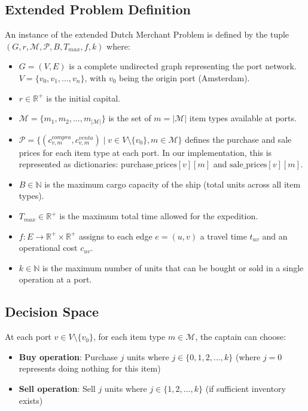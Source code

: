 \documentclass[12pt]{article}
\begin{document}
\subsection{Extended Problem Definition}

An instance of the extended Dutch Merchant Problem is defined by the tuple $(G, r, \mathcal{M}, \mathcal{P}, B, T_{max}, f, k)$ where:

\begin{itemize}
    \item $G=(V, E)$ is a complete undirected graph representing the port network. $V = \{v_0, v_1, ..., v_n\}$, with $v_0$ being the origin port (Amsterdam).
    \item $r \in \mathbb{R}^+$ is the initial capital.
    \item $\mathcal{M} = \{m_1, m_2, ..., m_{|\mathcal{M}|}\}$ is the set of $m = |\mathcal{M}|$ item types available at ports.
    \item $\mathcal{P} = \{(c_{v,m}^{compra}, c_{v,m}^{venta}) \mid v \in V \setminus \{v_0\}, m \in \mathcal{M}\}$ defines the purchase and sale prices for each item type at each port. In our implementation, this is represented as dictionaries: $\text{purchase\_prices}[v][m]$ and $\text{sale\_prices}[v][m]$.
    \item $B \in \mathbb{N}$ is the maximum cargo capacity of the ship (total units across all item types).
    \item $T_{max} \in \mathbb{R}^+$ is the maximum total time allowed for the expedition.
    \item $f: E \rightarrow \mathbb{R}^+ \times \mathbb{R}^+$ assigns to each edge $e=(u,v)$ a travel time $t_{uv}$ and an operational cost $c_{uv}$.
    \item $k \in \mathbb{N}$ is the maximum number of units that can be bought or sold in a single operation at a port.
\end{itemize}

\subsection{Decision Space}

At each port $v \in V \setminus \{v_0\}$, for each item type $m \in \mathcal{M}$, the captain can choose:

\begin{itemize}
    \item \textbf{Buy operation}: Purchase $j$ units where $j \in \{0, 1, 2, ..., k\}$ (where $j=0$ represents doing nothing for this item)
    \item \textbf{Sell operation}: Sell $j$ units where $j \in \{1, 2, ..., k\}$ (if sufficient inventory exists)
\end{itemize}
\end{document}
